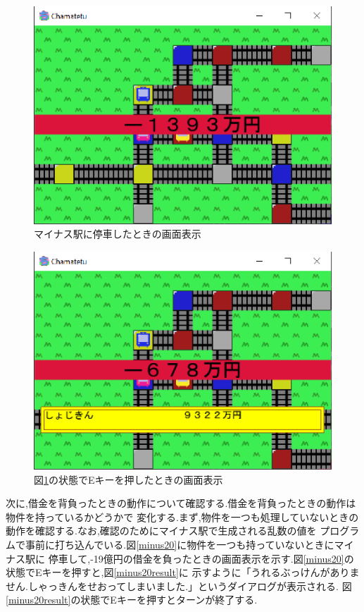 \documentclass[a4j]{jarticle}
\begin{document}
    \begin{figure}[H]
        \centering
        \includegraphics[scale=1.3]{minus.eps}
        \caption{マイナス駅に停車したときの画面表示}
         \label{minusmass}
        \end{figure}

    \begin{figure}[H]
        \centering
        \includegraphics[scale=1.3]{minusresult.eps}
        \caption{図\ref{minusmass}の状態でEキーを押したときの画面表示}
         \label{minusmassresult}
        \end{figure}

    次に,借金を背負ったときの動作について確認する.借金を背負ったときの動作は物件を持っているかどうかで
    変化する.まず,物件を一つも処理していないときの動作を確認する.なお,確認のためにマイナス駅で生成される乱数の値を
    プログラムで事前に打ち込んでいる.図\ref{minus20}に物件を一つも持っていないときにマイナス駅に
    停車して,-19億円の借金を負ったときの画面表示を示す.図\ref{minus20}の状態でEキーを押すと,図\ref{minus20result}に
    示すように「うれるぶっけんがありません.しゃっきんをせおってしまいました.」というダイアログが表示される.
    図\ref{minus20result}の状態でEキーを押すとターンが終了する.
    
\end{document}
